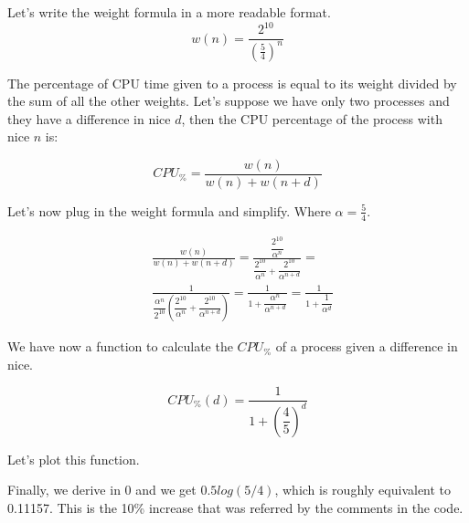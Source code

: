 \documentclass[10pt, oneside]{book}
\begin{document}

Let's write the weight formula in a more readable format.
\begin{equation}
    w(n) = \frac{2^{10}}{(\frac{5}{4})^{n}}
\end{equation}

The percentage of CPU time given to a process is equal to its weight divided by the sum of all the other weights. Let's suppose we have only two processes and they have a difference in nice $d$, then the CPU percentage of the process with nice $n$ is:

\begin{equation}
    CPU_\% = \frac{w(n)}{w(n)+w(n+d)}
\end{equation}

Let's now plug in the weight formula and simplify. Where $\alpha=\frac{5}{4}$. 

\begin{align*}
    &\frac{w(n)}{w(n)+w(n+d)} =
    \frac{\dfrac{2^{10}}{\alpha^{n}}}{\dfrac{2^{10}}{\alpha^{n}}+\dfrac{2^{10}}{\alpha^{n+d}}} =\\
    &\frac{1}{\dfrac{\alpha^{n}}{2^{10}} \left(\dfrac{2^{10}}{\alpha^{n}}+\dfrac{2^{10}}{\alpha^{n+d}}\right)} =
    \frac{1}{1+\dfrac{\alpha^{n}}{\alpha^{n+d}}} =
    \frac{1}{1+\dfrac{1}{\alpha^{d}}}
\end{align*}

We have now a function to calculate the $CPU_\%$ of a process given a difference in nice. 

\begin{equation}
    CPU_\%(d)=\frac{1}{1+\left(\dfrac{4}{5}\right)^{d}}
\end{equation}

Let's plot this function.


Finally, we derive in 0 and we get $0.5log(5/4)$, which is roughly equivalent to 0.11157. This is the 10\% increase that was referred by the comments in the code.
\end{document}
